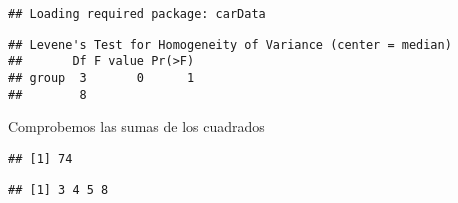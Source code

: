 \documentclass[
]{article}
\newenvironment{Shaded}{\begin{snugshade}}{\end{snugshade}}
\newcommand{\AttributeTok}[1]{\textcolor[rgb]{0.77,0.63,0.00}{#1}}
\newcommand{\DecValTok}[1]{\textcolor[rgb]{0.00,0.00,0.81}{#1}}
\newcommand{\FunctionTok}[1]{\textcolor[rgb]{0.00,0.00,0.00}{#1}}
\newcommand{\NormalTok}[1]{#1}
\newcommand{\OtherTok}[1]{\textcolor[rgb]{0.56,0.35,0.01}{#1}}
\newcommand{\SpecialCharTok}[1]{\textcolor[rgb]{0.00,0.00,0.00}{#1}}
\begin{document}
\begin{verbatim}
## Loading required package: carData
\end{verbatim}

\begin{Shaded}
\end{Shaded}

\begin{verbatim}
## Levene's Test for Homogeneity of Variance (center = median)
##       Df F value Pr(>F)
## group  3       0      1
##        8
\end{verbatim}

Comprobemos las sumas de los cuadrados

\begin{Shaded}
\end{Shaded}

\begin{verbatim}
## [1] 74
\end{verbatim}

\begin{Shaded}
\end{Shaded}

\begin{verbatim}
## [1] 3 4 5 8
\end{verbatim}
\end{document}
